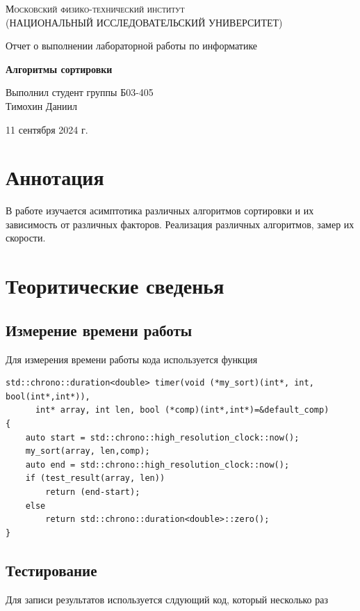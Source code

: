 \documentclass[12pt,a4paper]{article}
\def \TITLE {Отчет о выполнении лабораторной работы по информатике}
\def \SUBTITLE {Алгоритмы сортировки}
\def \AUTHOR {Выполнил студент группы Б03-405\\ Тимохин Даниил}
\def \DATE {11 сентября 2024 г.}
\begin{document}
\begin{titlepage}
	\centering
	\vspace{5cm}
	{\scshape\large Московский физико-технический институт \\
	(НАЦИОНАЛЬНЫЙ ИССЛЕДОВАТЕЛЬСКИЙ УНИВЕРСИТЕТ)}
	
	\vspace{4cm}
	{\LARGE \TITLE}
	
	\vspace{1cm}
	{\Huge\bf \SUBTITLE }
	
	\vspace{1cm}
	\vfill
	
\begin{flushright}
	{\LARGE \AUTHOR}
\end{flushright}
	

	\vfill

	\DATE
\end{titlepage}

\newpage

\fontsize{12}{14}\selectfont



\section{ Аннотация}
В работе изучается асимптотика различных алгоритмов сортировки и их зависимость от различных факторов. Реализация различных алгоритмов, замер их скорости.

\section{ Теоритические сведенья}
\subsection{ Измерение времени работы}
Для измерения времени работы кода используется функция
\begin{verbatim}
std::chrono::duration<double> timer(void (*my_sort)(int*, int, bool(int*,int*)), 
      int* array, int len, bool (*comp)(int*,int*)=&default_comp)
{
    auto start = std::chrono::high_resolution_clock::now();
    my_sort(array, len,comp);
    auto end = std::chrono::high_resolution_clock::now();
    if (test_result(array, len))
        return (end-start);
    else
        return std::chrono::duration<double>::zero();
}
\end{verbatim}


\subsection{ Тестирование}
Для записи результатов используется слдующий код, который несколько раз
\end{document}
